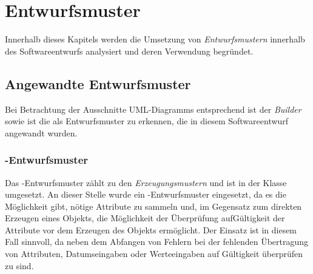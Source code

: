 \chapter{Entwurfsmuster}
\label{entwurfsmuster}
Innerhalb dieses Kapitels werden die Umsetzung von \textit{Entwurfsmustern} innerhalb des Softwareentwurfs analysiert und deren Verwendung begründet.


\section{Angewandte Entwurfsmuster}
Bei Betrachtung der Ausschnitte UML-Diagramms entsprechend  ist der \textit{Builder} sowie  ist die  als Entwurfsmuster zu erkennen, die in diesem Softwareentwurf angewandt wurden.



\subsection*{-Entwurfsmuster}
Das -Entwurfsmuster zählt zu den \textit{Erzeugungsmustern} und ist in der Klasse  umgesetzt.
An dieser Stelle wurde ein -Entwurfsmuster eingesetzt, da es die Möglichkeit gibt, nötige Attribute zu sammeln und, im Gegensatz zum direkten Erzeugen eines Objekts, die Möglichkeit der Überprüfung aufGültigkeit der Attribute vor dem Erzeugen des Objekts ermöglicht.
Der Einsatz ist in diesem Fall sinnvoll, da neben dem Abfangen von Fehlern bei der fehlenden Übertragung von Attributen, Datumseingaben oder Werteeingaben auf Gültigkeit überprüfen zu sind.

